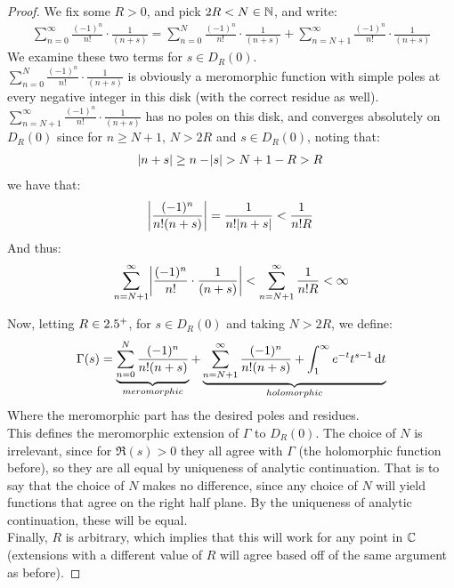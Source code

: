 \begin{proof}
We fix some $R>0$, and pick $2R < N \in \mathbb{N}$, and write:
\begin{align*}
    \sum_{n=0}^\infty \frac{(-1)^n}{n!} \cdot \frac{1}{(n+s)} = \sum_{n=0}^N \frac{(-1)^n}{n!} \cdot \frac{1}{(n+s)} + \sum_{n=N+1}^\infty \frac{(-1)^n}{n!} \cdot \frac{1}{(n+s)}
\end{align*}
We examine these two terms for $s \in D_R(0)$.\\

$\sum_{n=0}^N \frac{(-1)^n}{n!} \cdot \frac{1}{(n+s)}$ is obviously a meromorphic function with simple poles at every negative integer in this disk (with the correct residue as well).\\

$\sum_{n=N+1}^\infty \frac{(-1)^n}{n!} \cdot \frac{1}{(n+s)}$ has no poles on this disk, and converges absolutely on $D_R(0)$ since for $n\geq N+1, \, N > 2R$ and $s \in D_R(0)$, noting that:
\begin{align*}
    \abs{n+s} \geq n - \abs{s} > N+1 -R > R
\end{align*}
we have that:
\begin{align*}
    \abs{\frac{(-1)^n}{n!(n+s)}} = \frac{1}{n!\abs{n+s}} < \frac{1}{n!R}
\end{align*}
And thus:
\begin{align*}
    \sum_{n=N+1}^\infty \abs{\frac{(-1)^n}{n!} \cdot \frac{1}{(n+s)}} < \sum_{n=N+1}^\infty \frac{1}{n! R} < \infty
\end{align*}


Now, letting $R \in 2.5^+$, for $s \in D_R(0)$ and taking $N> 2R$, we define:
\begin{align*}
    \Gamma(s) = \underbrace{\sum_{n=0}^N \frac{(-1)^n}{n!(n+s)}}_{meromorphic} + \underbrace{\sum_{n=N+1}^\infty \frac{(-1)^n}{n!(n+s)} + \int_1^\infty e^{-t} t^{s-1} \dif t}_{holomorphic}
\end{align*}
Where the meromorphic part has the desired poles and residues.\\

This defines the meromorphic extension of $\Gamma$ to $D_R(0)$. The choice of $N$ is irrelevant, since for $\Re(s) > 0 $ they all agree with $\Gamma$ (the holomorphic function before), so they are all equal by uniqueness of analytic continuation. That is to say that the choice of $N$ makes no difference, since any choice of $N$ will yield functions that agree on the right half plane. By the uniqueness of analytic continuation, these will be equal.\\

Finally, $R$ is arbitrary, which implies that this will work for any point in $\mathbb{C}$ (extensions with a different value of $R$ will agree based off of the same argument as before).

\end{proof}

